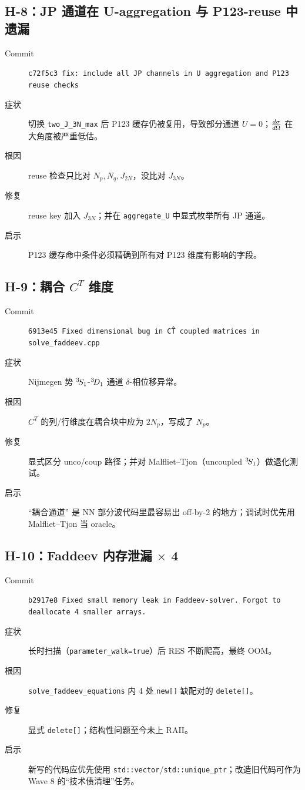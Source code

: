 \subsection{H-8：JP 通道在 U-aggregation 与 P123-reuse 中遗漏}

\begin{description}
  \item[Commit] \texttt{c72f5c3 fix: include all JP channels in U aggregation and P123 reuse checks}
  \item[症状] 切换 \texttt{two\_J\_3N\_max} 后 P123 缓存仍被复用，导致部分通道 \(U=0\)；\(\frac{d\sigma}{d\Omega}\) 在大角度被严重低估。
  \item[根因] reuse 检查只比对 \(N_p,N_q,J_{2N}\)，没比对 \(J_{3N}\)。
  \item[修复] reuse key 加入 \(J_{3N}\)；并在 \texttt{aggregate\_U} 中显式枚举所有 JP 通道。
  \item[启示] P123 缓存命中条件必须精确到所有对 P123 维度有影响的字段。
\end{description}

\subsection{H-9：耦合 \(C^T\) 维度}

\begin{description}
  \item[Commit] \texttt{6913e45 Fixed dimensional bug in C\^T coupled matrices in solve\_faddeev.cpp}
  \item[症状] Nijmegen 势 \({}^{3}\!S_{1}\)-\({}^{3}\!D_{1}\) 通道 \(\delta\)-相位移异常。
  \item[根因] \(C^T\) 的列/行维度在耦合块中应为 \(2N_p\)，写成了 \(N_p\)。
  \item[修复] 显式区分 unco/coup 路径；并对 Malfliet--Tjon（uncoupled \({}^{3}\!S_{1}\)）做退化测试。
  \item[启示] “耦合通道” 是 NN 部分波代码里最容易出 off-by-2 的地方；调试时优先用 Malfliet--Tjon 当 oracle。
\end{description}

\subsection{H-10：Faddeev 内存泄漏 \(\times\) 4}

\begin{description}
  \item[Commit] \texttt{b2917e8 Fixed small memory leak in Faddeev-solver. Forgot to deallocate 4 smaller arrays.}
  \item[症状] 长时扫描（\texttt{parameter\_walk=true}）后 RES 不断爬高，最终 OOM。
  \item[根因] \texttt{solve\_faddeev\_equations} 内 4 处 \texttt{new[]} 缺配对的 \texttt{delete[]}。
  \item[修复] 显式 \texttt{delete[]}；结构性问题至今未上 RAII。
  \item[启示] 新写的代码应优先使用 \texttt{std::vector}/\texttt{std::unique\_ptr}；改造旧代码可作为 Wave 8 的“技术债清理”任务。
\end{description}

